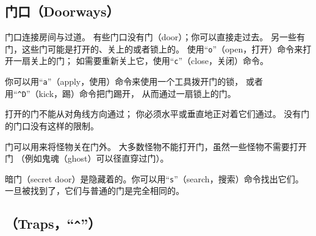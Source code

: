 \documentclass[a4paper, 10pt]{article}
\begin{document}
\subsection*{门口（Doorways）}

门口连接房间与过道。
有些门口没有门（door）；你可以直接走过去。
另一些有门，这些门可能是打开的、关上的或者锁上的。
使用“{\tt o}”（open，打开）命令来打开一扇关上的门；
如需要重新关上它，使用“{\tt c}”（close，关闭）命令。

你可以用“{\tt a}”（apply，使用）命令来使用一个工具拨开门的锁，
或者用“{\tt \^{}D}”（kick，踢）命令把门踢开，
从而通过一扇锁上的门。

打开的门不能从对角线方向通过；
你必须水平或垂直地正对着它们通过。
没有门的门口没有这样的限制。

门可以用来将怪物关在门外。
大多数怪物不能打开门，虽然一些怪物不需要打开门
（例如鬼魂（ghost）可以径直穿过门）。

暗门（secret door）是隐藏着的。你可以用“{\tt s}”（search，搜索）命令找出它们。
一旦被找到了，它们与普通的门是完全相同的。

\subsection*{\zhTransTraps（Traps，“{\tt \^{}}”）}
\end{document}
